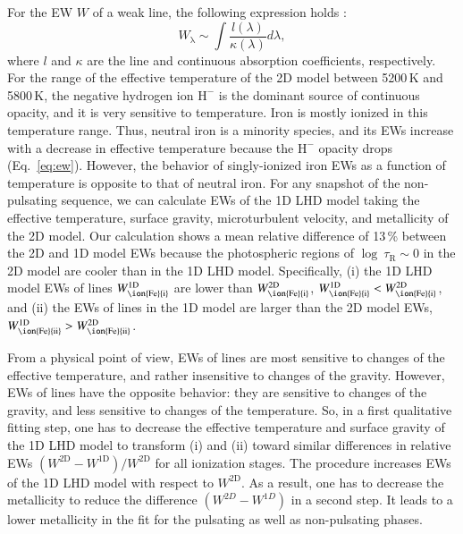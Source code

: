 \documentclass{aa}
\begin{document}
For the EW $W$ of a weak line, the following expression
holds \citep{1992oasp.book.....G}:
%
\begin{equation} \label{eq:ew}
  W_\mathrm{\lambda} \sim 
  \int \frac{l(\lambda)}{\kappa(\lambda)} d\lambda,
  \end{equation}  
%
where $l$ and $\kappa$ are the line and continuous absorption coefficients,
respectively.  For the range of the effective temperature of the 2D model
between 5200\,K and 5800\,K, the negative hydrogen ion $\mathrm{H}^{-}$ is the
dominant source of continuous opacity, and it is very sensitive to
temperature.  Iron is mostly ionized in this temperature range.
Thus, neutral iron is a minority species, and its EWs 
increase with a decrease in effective temperature because the
$\mathrm{H}^{-}$ opacity drops (Eq.~\ref{eq:ew}). 
However, the behavior of  singly-ionized iron EWs as a function of 
temperature  is opposite  to that of neutral iron.  
For any snapshot of the non-pulsating sequence,
we can calculate EWs of the 1D LHD model 
taking the effective temperature, surface gravity, microturbulent 
velocity,  and metallicity of the  2D model. Our calculation  shows 
a mean relative difference  of 13\,\% between the 2D and 1D model EWs 
because the photospheric  regions of
$\log~\tau_\mathrm{R} \sim 0$ in the 2D model are cooler than in 
the 1D  LHD model.
Specifically, (i) the 1D LHD model EWs of  lines $W_\mathrm{\ion{Fe}{i}}^\mathrm{1D}$
are lower than $W_\mathrm{\ion{Fe}{i}}^\mathrm{2D}$,
$W_\mathrm{\ion{Fe}{i}}^\mathrm{1D}< W_\mathrm{\ion{Fe}{i}}^\mathrm{2D}$, and 
(ii) the EWs of  lines in the 1D model are larger than the 2D model EWs,
$W_\mathrm{\ion{Fe}{ii}}^\mathrm{1D} > W_\mathrm{\ion{Fe}{ii}}^\mathrm{2D}$.

From a physical point of view, EWs of  lines are most sensitive to changes of the effective
temperature, and rather insensitive to changes of the gravity. However,  EWs of 
lines have the opposite behavior: they are sensitive to changes of the
gravity, and less sensitive to changes of the temperature. So, in a 
first qualitative fitting step, one has to decrease  
the effective temperature and surface gravity of the 1D LHD model 
to transform (i) and (ii) toward similar differences in 
relative EWs $(W^\mathrm{2D} -W^\mathrm{1D})/W^\mathrm{2D}$ for 
all ionization stages. The procedure increases
EWs of the 1D LHD model  with respect to $W^\mathrm{2D}$. As a result, 
one has to  decrease   the metallicity to reduce the difference $(W^{2D}-W^{1D})$
in a second step. 
It leads to a lower metallicity in the fit 
for the pulsating as well as non-pulsating phases.  
\end{document}
